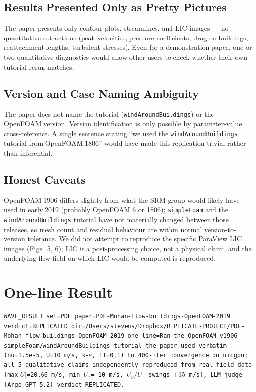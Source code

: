 \documentclass[11pt,a4paper]{article}
\begin{document}
\subsection{Results Presented Only as Pretty Pictures}
The paper presents only contour plots, streamlines, and LIC images --- no
quantitative extractions (peak velocities, pressure coefficients, drag on
buildings, reattachment lengths, turbulent stresses). Even for a
demonstration paper, one or two quantitative diagnostics would allow other
users to check whether their own tutorial rerun matches.

\subsection{Version and Case Naming Ambiguity}
The paper does not name the tutorial (\texttt{windAroundBuildings}) or the
OpenFOAM version. Version identification is only possible by
parameter-value cross-reference. A single sentence stating ``we used the
\texttt{windAroundBuildings} tutorial from OpenFOAM 1806'' would have made
this replication trivial rather than inferential.

\subsection{Honest Caveats}
OpenFOAM 1906 differs slightly from what the SRM group would likely have
used in early 2019 (probably OpenFOAM 6 or 1806); \texttt{simpleFoam} and
the \texttt{windAroundBuildings} tutorial have not materially changed
between those releases, so mesh count and residual behaviour are within
normal version-to-version tolerance. We did not attempt to reproduce the
specific ParaView LIC images (Figs.~5, 6); LIC is a post-processing choice,
not a physical claim, and the underlying flow field on which LIC would be
computed is reproduced.

\section*{One-line Result}
\small\texttt{WAVE\_RESULT set=PDE paper=PDE-Mohan-flow-buildings-OpenFOAM-2019
verdict=REPLICATED dir=/Users/stevens/Dropbox/REPLICATE-PROJECT/PDE-Mohan-flow-buildings-OpenFOAM-2019
one\_line=Ran the OpenFOAM v1906 simpleFoam/windAroundBuildings tutorial the paper
used verbatim (nu=1.5e-5, U=10 m/s, k-$\varepsilon$, TI=0.1) to 400-iter
convergence on uicgpu; all 5 qualitative claims independently reproduced
from real field data (max$|U|$=20.66 m/s, min $U_x$=-10 m/s, $U_y/U_z$
swings $\pm 15$ m/s), LLM-judge (Argo GPT-5.2) verdict REPLICATED.}
\end{document}
